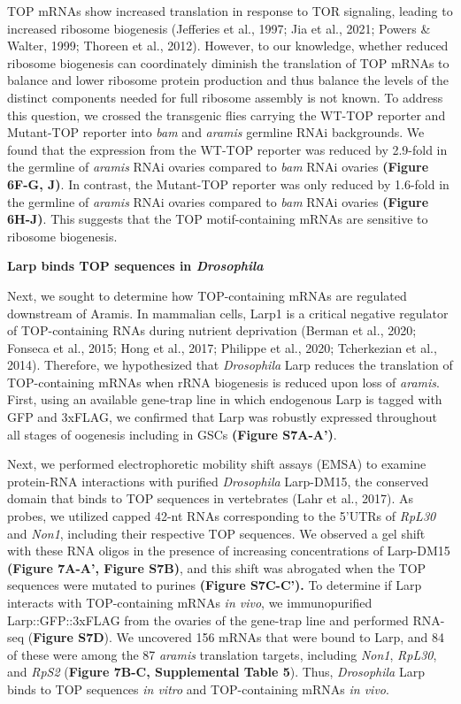 \documentclass[12pt,twoside]{reedthesis}
\begin{document}
TOP mRNAs show increased translation in response to TOR signaling,
leading to increased ribosome biogenesis
(Jefferies et al., 1997; Jia et al., 2021; Powers \& Walter, 1999; Thoreen et al., 2012). However, to our knowledge,
whether reduced ribosome biogenesis can coordinately diminish the
translation of TOP mRNAs to balance and lower ribosome protein
production and thus balance the levels of the distinct components needed
for full ribosome assembly is not known. To address this question, we
crossed the transgenic flies carrying the WT-TOP reporter and Mutant-TOP
reporter into \emph{bam} and \emph{aramis} germline RNAi backgrounds. We found
that the expression from the WT-TOP reporter was reduced by 2.9-fold in
the germline of \emph{aramis} RNAi ovaries compared to \emph{bam} RNAi ovaries
\textbf{(Figure 6F-G, J)}. In contrast, the Mutant-TOP reporter was only
reduced by 1.6-fold in the germline of \emph{aramis} RNAi ovaries compared to
\emph{bam} RNAi ovaries \textbf{(Figure 6H-J)}. This suggests that the TOP
motif-containing mRNAs are sensitive to ribosome biogenesis.

\textbf{Larp binds TOP sequences in \emph{Drosophila}}

Next, we sought to determine how TOP-containing mRNAs are regulated
downstream of Aramis. In mammalian cells, Larp1 is a critical negative
regulator of TOP-containing RNAs during nutrient deprivation
(Berman et al., 2020; Fonseca et al., 2015; Hong et al., 2017; Philippe et al., 2020; Tcherkezian et al., 2014). Therefore, we
hypothesized that \emph{Drosophila} Larp reduces the translation of
TOP-containing mRNAs when rRNA biogenesis is reduced upon loss of
\emph{aramis}. First, using an available gene-trap line in which endogenous
Larp is tagged with GFP and 3xFLAG, we confirmed that Larp was robustly
expressed throughout all stages of oogenesis including in GSCs \textbf{(Figure
S7A-A')}.

Next, we performed electrophoretic mobility shift assays (EMSA) to
examine protein-RNA interactions with purified \emph{Drosophila} Larp-DM15,
the conserved domain that binds to TOP sequences in vertebrates
(Lahr et al., 2017). As probes, we utilized capped 42-nt RNAs corresponding
to the 5'UTRs of \emph{RpL30} and \emph{Non1}, including their respective TOP
sequences. We observed a gel shift with these RNA oligos in the presence
of increasing concentrations of Larp-DM15 \textbf{(Figure 7A-A', Figure
S7B)}, and this shift was abrogated when the TOP sequences were mutated
to purines \textbf{(Figure S7C-C').} To determine if Larp interacts with
TOP-containing mRNAs \emph{in vivo}, we immunopurified Larp::GFP::3xFLAG from
the ovaries of the gene-trap line and performed RNA-seq (\textbf{Figure
S7D}). We uncovered 156 mRNAs that were bound to Larp, and 84 of these
were among the 87 \emph{aramis} translation targets, including \emph{Non1},
\emph{RpL30}, and \emph{RpS2} (\textbf{Figure 7B-C, Supplemental Table 5}). Thus,
\emph{Drosophila} Larp binds to TOP sequences \emph{in vitro} and TOP-containing
mRNAs \emph{in vivo}.
\end{document}
